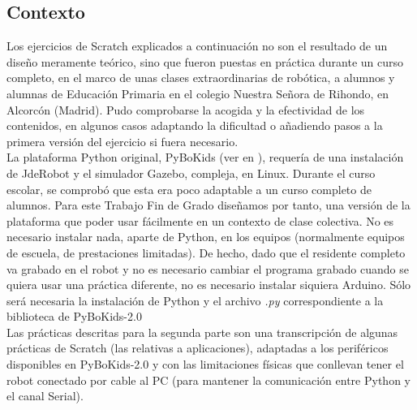 \subsection{Contexto}\label{subsec:contexto}
Los ejercicios de Scratch explicados a continuación no son el resultado de un diseño meramente teórico, sino que fueron puestas en práctica durante un curso completo, en el marco de unas clases extraordinarias de robótica, a alumnos y alumnas de Educación Primaria en el colegio Nuestra Señora de Rihondo, en Alcorcón (Madrid). Pudo comprobarse la acogida y la efectividad de los contenidos, en algunos casos adaptando la dificultad o añadiendo pasos a la primera versión del ejercicio si fuera necesario. \\
La plataforma Python original, PyBoKids (ver en \cite{JdeRobot}), requería de una instalación de JdeRobot y el simulador Gazebo, compleja, en Linux. Durante el curso escolar, se comprobó que esta era poco adaptable a un curso  completo de alumnos. Para este Trabajo Fin de Grado diseñamos por tanto, una versión de la plataforma que poder usar fácilmente en un contexto de clase colectiva. No es necesario instalar nada, aparte de Python, en los equipos (normalmente equipos de escuela, de prestaciones limitadas). De hecho, dado que el residente completo va grabado en el robot y no es necesario cambiar el programa grabado cuando se quiera usar una práctica diferente, no es necesario instalar siquiera Arduino. Sólo será necesaria la instalación de Python y el archivo \textit{.py} correspondiente a la biblioteca de PyBoKids-2.0 \\
Las prácticas descritas para la segunda parte son una transcripción de algunas prácticas de Scratch (las relativas a aplicaciones), adaptadas a los periféricos disponibles en PyBoKids-2.0 y con las limitaciones físicas que conllevan tener el robot conectado por cable al PC (para mantener la comunicación entre Python y el canal Serial). 


